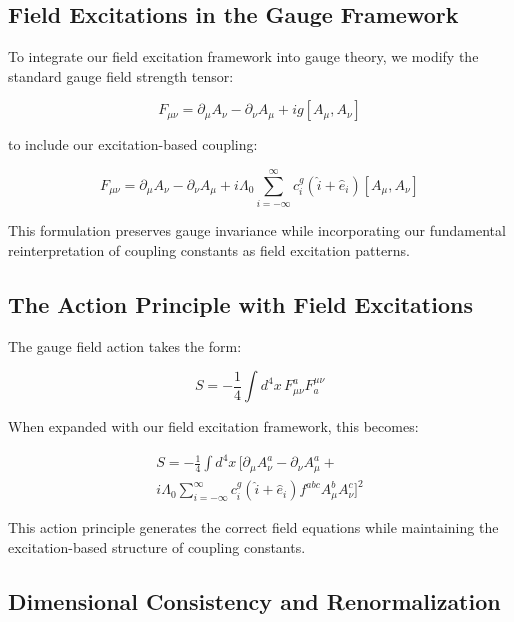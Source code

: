 \documentclass{article}
\begin{document}
\subsection{Field Excitations in the Gauge Framework}

To integrate our field excitation framework into gauge theory, we modify the standard gauge field strength tensor:

\begin{equation}
F_{\mu\nu} = \partial_\mu A_\nu - \partial_\nu A_\mu + ig[A_\mu, A_\nu]
\end{equation}

to include our excitation-based coupling:

\begin{equation}
F_{\mu\nu} = \partial_\mu A_\nu - \partial_\nu A_\mu + i\Lambda_0 \sum_{i=-\infty}^{\infty} c_i^g (\hat{i} + \hat{e}_i) [A_\mu, A_\nu]
\end{equation}

This formulation preserves gauge invariance while incorporating our fundamental reinterpretation of coupling constants as field excitation patterns.

\subsection{The Action Principle with Field Excitations}

The gauge field action takes the form:

\begin{equation}
S = -\frac{1}{4}\int d^4x \, F_{\mu\nu}^a F^{\mu\nu}_a
\end{equation}

When expanded with our field excitation framework, this becomes:

\begin{multline}
S = -\frac{1}{4}\int d^4x \, \Bigg[\partial_\mu A_\nu^a - \partial_\nu A_\mu^a + \\
i\Lambda_0 \sum_{i=-\infty}^{\infty} c_i^g (\hat{i} + \hat{e}_i) f^{abc}A_\mu^b A_\nu^c\Bigg]^2
\end{multline}

This action principle generates the correct field equations while maintaining the excitation-based structure of coupling constants.

\subsection{Dimensional Consistency and Renormalization}
\end{document}

